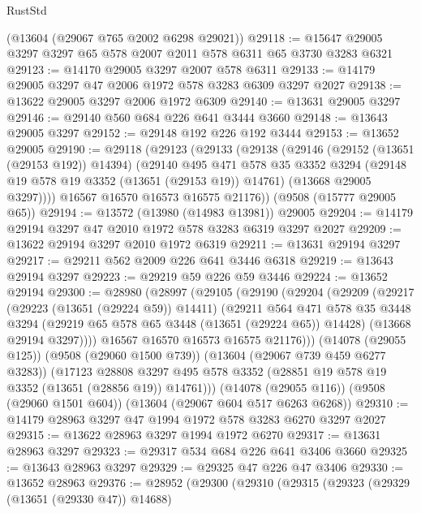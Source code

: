 \begin{lexlean}{RustStd}
\begin{coremodule}
    (@13604 (@29067 @765 @2002 @6298 @29021))
@29118 := @15647 @29005 @3297 @3297 @65 @578 @2007 @2011 @578 @6311 @65 @3730 @3283 @6321
@29123 := @14170 @29005 @3297 @2007 @578 @6311
@29133 := @14179 @29005 @3297 @47 @2006 @1972 @578 @3283 @6309 @3297 @2027
@29138 := @13622 @29005 @3297 @2006 @1972 @6309
@29140 := @13631 @29005 @3297
@29146 := @29140 @560 @684 @226 @641 @3444 @3660
@29148 := @13643 @29005 @3297
@29152 := @29148 @192 @226 @192 @3444
@29153 := @13652 @29005
@29190 := @29118
    (@29123
      (@29133
        (@29138
          (@29146
            (@29152 (@13651 (@29153 @192)) @14394)
            (@29140
              @495
              @471
              @578
              @35
              @3352
              @3294
              (@29148 @19 @578 @19 @3352 (@13651 (@29153 @19)) @14761)
              (@13668 @29005 @3297))))
        @16567
        @16570
        @16573
        @16575
        @21176))
    (@9508 (@15777 @29005 @65))
@29194 := @13572 (@13980 (@14983 @13981)) @29005
@29204 := @14179 @29194 @3297 @47 @2010 @1972 @578 @3283 @6319 @3297 @2027
@29209 := @13622 @29194 @3297 @2010 @1972 @6319
@29211 := @13631 @29194 @3297
@29217 := @29211 @562 @2009 @226 @641 @3446 @6318
@29219 := @13643 @29194 @3297
@29223 := @29219 @59 @226 @59 @3446
@29224 := @13652 @29194
@29300 := @28980
    (@28997
      (@29105
        (@29190
          (@29204
            (@29209
              (@29217
                (@29223 (@13651 (@29224 @59)) @14411)
                (@29211
                  @564
                  @471
                  @578
                  @35
                  @3448
                  @3294
                  (@29219 @65 @578 @65 @3448 (@13651 (@29224 @65)) @14428)
                  (@13668 @29194 @3297))))
            @16567
            @16570
            @16573
            @16575
            @21176)))
      (@14078 (@29055 @125))
      (@9508 (@29060 @1500 @739))
      (@13604 (@29067 @739 @459 @6277 @3283))
      (@17123
        @28808
        @3297
        @495
        @578
        @3352
        (@28851 @19 @578 @19 @3352 (@13651 (@28856 @19)) @14761)))
    (@14078 (@29055 @116))
    (@9508 (@29060 @1501 @604))
    (@13604 (@29067 @604 @517 @6263 @6268))
@29310 := @14179 @28963 @3297 @47 @1994 @1972 @578 @3283 @6270 @3297 @2027
@29315 := @13622 @28963 @3297 @1994 @1972 @6270
@29317 := @13631 @28963 @3297
@29323 := @29317 @534 @684 @226 @641 @3406 @3660
@29325 := @13643 @28963 @3297
@29329 := @29325 @47 @226 @47 @3406
@29330 := @13652 @28963
@29376 := @28952
    (@29300
      (@29310
        (@29315
          (@29323
            (@29329 (@13651 (@29330 @47)) @14688)

\end{coremodule}
\end{lexlean}
